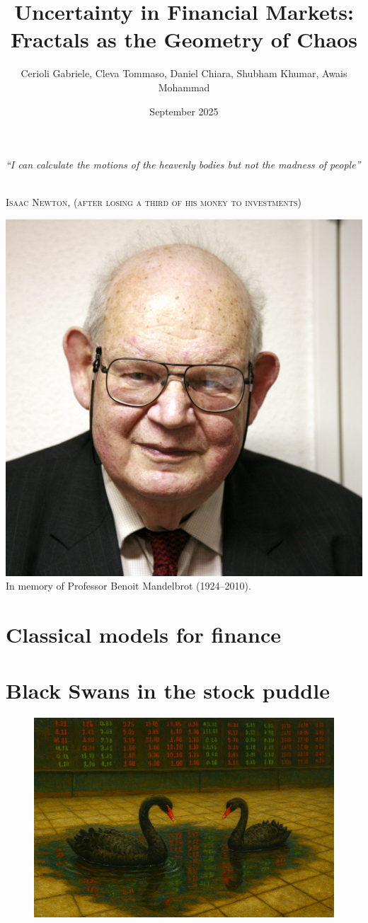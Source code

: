\documentclass[english]{article}
\title{Uncertainty in Financial Markets: Fractals as the Geometry of Chaos}
\author{Cerioli Gabriele, Cleva Tommaso, Daniel Chiara, Shubham Khumar, Awais Mohammad}
\date{September 2025}
\begin{document}
\maketitle

\vspace{1cm}
\begin{center}
    \epigraph{\large\textit{“I can calculate the motions of the heavenly bodies but not the madness of people”}%
    \normalsize\ }%
{\large\scshape Isaac Newton, {\ttfamily (after losing a third of his money to investments)}}
\end{center}


\vfill
\begin{center}
    \includegraphics[width=0.5\linewidth]{img/mandelbrot.jpg}\\[0.3cm]
    \huge In memory of Professor Benoit Mandelbrot (1924--2010).\\
\end{center}


\newpage
\tableofcontents

\newpage
\section{Classical models for finance}


\section{Black Swans in the stock puddle}

\begin{figure} [H]
    \centering
    \includegraphics[width=0.65\linewidth]{img/Copilot_20250925_235000.png}
\end{figure}

\end{document}
